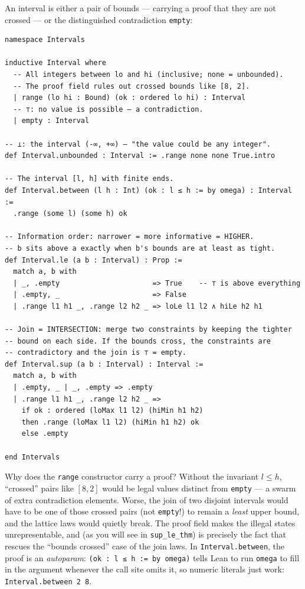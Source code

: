\documentclass[12pt, a4paper, openright]{book}
\theoremstyle{thmstyle}
\theoremstyle{defstyle}
\newcommand{\lc}[1]{\texttt{#1}}
\begin{document}
An interval is either a pair of bounds --- carrying a proof that they are
not crossed --- or the distinguished contradiction \lc{empty}:

\begin{verbatim}
namespace Intervals

inductive Interval where
  -- All integers between lo and hi (inclusive; none = unbounded).
  -- The proof field rules out crossed bounds like [8, 2].
  | range (lo hi : Bound) (ok : ordered lo hi) : Interval
  -- ⊤: no value is possible — a contradiction.
  | empty : Interval

-- ⊥: the interval (-∞, +∞) — "the value could be any integer".
def Interval.unbounded : Interval := .range none none True.intro

-- The interval [l, h] with finite ends.
def Interval.between (l h : Int) (ok : l ≤ h := by omega) : Interval :=
  .range (some l) (some h) ok

-- Information order: narrower = more informative = HIGHER.
-- b sits above a exactly when b's bounds are at least as tight.
def Interval.le (a b : Interval) : Prop :=
  match a, b with
  | _, .empty                      => True    -- ⊤ is above everything
  | .empty, _                      => False
  | .range l1 h1 _, .range l2 h2 _ => loLe l1 l2 ∧ hiLe h2 h1

-- Join = INTERSECTION: merge two constraints by keeping the tighter
-- bound on each side. If the bounds cross, the constraints are
-- contradictory and the join is ⊤ = empty.
def Interval.sup (a b : Interval) : Interval :=
  match a, b with
  | .empty, _ | _, .empty => .empty
  | .range l1 h1 _, .range l2 h2 _ =>
    if ok : ordered (loMax l1 l2) (hiMin h1 h2)
    then .range (loMax l1 l2) (hiMin h1 h2) ok
    else .empty

end Intervals
\end{verbatim}

Why does the \lc{range} constructor carry a proof? Without the invariant
$l \leq h$, ``crossed'' pairs like $[8, 2]$ would be legal values distinct
from \lc{empty} --- a swarm of extra contradiction elements. Worse, the
join of two disjoint intervals would have to be one of those crossed pairs
(not \lc{empty}!) to remain a \emph{least} upper bound, and the lattice
laws would quietly break. The proof field makes the illegal states
unrepresentable, and (as you will see in \lc{sup\_le\_thm}) is precisely
the fact that rescues the ``bounds crossed'' case of the join laws. In
\lc{Interval.between}, the proof is an \emph{autoparam}:
\lc{(ok : l ≤ h := by omega)} tells Lean to run \lc{omega} to fill in the
argument whenever the call site omits it, so numeric literals just work:
\lc{Interval.between 2 8}.
\end{document}
